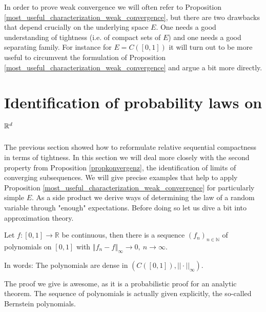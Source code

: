 In order to prove weak convergence we will often refer to Proposition \ref{most_useful_characterization_weak_convergence}, but there are two drawbacks that depend crucially on the underlying space $E$. One needs a good understanding of tightness (i.e. of compact sets of $E$) and one needs a good separating family. For instance for $E=C([0,1])$ it will turn out to be more useful to circumvent the formulation of Proposition \ref{most_useful_characterization_weak_convergence} and argue a bit more directly.

	\marginpar{\textcolor{red}{Lecture 14}}
\section[Identification of probability laws on $\R$]{Identification of probability laws on $\mathbb{R}^d$}\label{sec:unique}
The previous section showed how to reformulate relative sequential compactness in terms of tightness. In this section we will deal more closely with the second property from Proposition \ref{propkonvergenz}, the identification of limits of converging subsequences. We will give precise examples that help to apply Proposition \ref{most_useful_characterization_weak_convergence} for particularly simple $E$. As a side product we derive ways of determining the law of a random variable through "{}enough"{} expectations. Before doing so let us dive a bit into approximation theory.
\begin{lsatzwichtig}
\begin{theorem}\label{Weierstrass_approx}
	Let $f \colon [0,1] \to \mathbb{R}$ be continuous, then there is a sequence $(f_n)_{n\in\mathbb{N}}$ of polynomials on $[0,1]$ with $\left\Vert f_n - f \right\Vert_{\infty} \to 0, \: n \to \infty$.\smallskip
	
	In words: The polynomials are dense in $( C([0,1]),||\cdot||_\infty)$.
\end{theorem}
\end{lsatzwichtig}
The proof we give is awesome, as it is a probabilistic proof for an analytic theorem. The sequence of polynomials is actually given explicitly, the so-called Bernstein polynomials.

